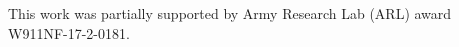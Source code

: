 
\setlength{\parskip}{1em}
\setlength{\parindent}{0em}

This work was partially supported by Army Research Lab (ARL) award W911NF-17-2-0181.
